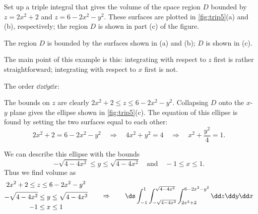 \begin{example}\label{ex_trip5}%
Set up a triple integral that gives the volume of the space region $D$ bounded by $z= 2x^2+2$ and $z=6-2x^2-y^2$. These surfaces are plotted in \autoref{fig:trip5}(a) and (b), respectively; the region $D$ is shown in part (c) of the figure.

\noindent\begin{minipage}[t]{\linewidth}\noindent%
\captionsetup{type=figure}%
\caption{The region $D$ is bounded by the surfaces shown in (a) and (b); $D$ is shown in (c).}
\label{fig:trip5}
\end{minipage}
\solution
The main point of this example is this: integrating with respect to $z$ first is rather straightforward; integrating with respect to $x$ first is not.\bigskip

\noindent The order $\dd z\dd y\dd x$:\bigskip

The bounds on $z$ are clearly $2x^2+2\leq z\leq 6-2x^2-y^2$. Collapsing $D$ onto the $x$-$y$ plane gives the ellipse shown in \autoref{fig:trip5}(c). The equation of this ellipse is found by setting the two surfaces equal to each other: 
\[2x^2+2 = 6-2x^2-y^2\quad \Rightarrow\quad 4x^2+y^2=4\quad \Rightarrow\quad x^2+\frac{y^2}4=1.\]

We can describe this ellipse with the bounds 
\[-\sqrt{4-4x^2} \leq y\leq \sqrt{4-4x^2}\quad \text{and}\quad -1\leq x\leq 1.\]
Thus we find volume as
\[
	\begin{gathered}
		2x^2+2\leq z\leq 6-2x^2-y^2\\
		-\sqrt{4-4x^2}\leq y\leq \sqrt{4-4x^2}\\
		-1\leq x\leq 1
	\end{gathered} 
	\qquad\Rightarrow\qquad
	\ds\int_{-1}^1\int_{-\sqrt{4-4x^2}}^{\sqrt{4-4x^2}}\int_{2x^2+2}^{6-2x^2-y^2}\dd z\dd y\dd x 
\]


\end{example}

